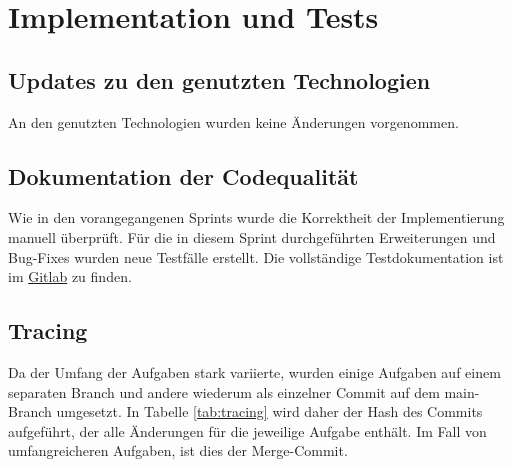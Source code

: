 \documentclass[a4paper,11pt]{article}
\begin{document}
\section{Implementation und Tests}
\subsection{Updates zu den genutzten Technologien}
An den genutzten Technologien wurden keine Änderungen vorgenommen.

\subsection{Dokumentation der Codequalität}
Wie in den vorangegangenen Sprints wurde die Korrektheit der Implementierung manuell überprüft.
Für die in diesem Sprint durchgeführten Erweiterungen und Bug-Fixes wurden neue Testfälle erstellt.
Die vollständige Testdokumentation ist im \href{https://git.informatik.uni-rostock.de/softwaretechnik-ws-2025-26/uebung3/team3/projekt-team3-uebung3/-/blob/main/abgabedokumente/Manuelle_Tests.pdf?ref_type=heads}{Gitlab} zu finden.

\subsection{Tracing}
Da der Umfang der Aufgaben stark variierte, wurden einige Aufgaben auf einem separaten Branch und andere wiederum als einzelner Commit auf dem main-Branch umgesetzt.
In Tabelle \ref{tab:tracing} wird daher der Hash des Commits aufgeführt, der alle Änderungen für die jeweilige Aufgabe enthält.
Im Fall von umfangreicheren Aufgaben, ist dies der Merge-Commit.
\end{document}
